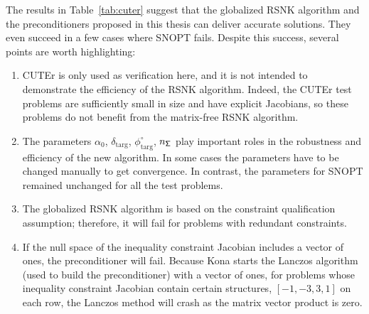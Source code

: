 The results in Table~\ref{tab:cuter} suggest 
that the globalized RSNK algorithm and the preconditioners proposed in this thesis can deliver accurate solutions. They even succeed in a few cases where SNOPT fails. Despite this success, several points are worth highlighting:
\begin{enumerate}\itemsep -2pt
\item CUTEr is only used as verification here, and it is not intended to demonstrate the efficiency of the RSNK algorithm.  Indeed, the CUTEr test problems are sufficiently small in size and have explicit Jacobians, so these problems do not benefit from the matrix-free RSNK algorithm.

\item The parameters \textbf{$\alpha_0$},  $\delta_{\text{targ}}$, $\phi^{\circ}_{\text{targ}}$,  $n_{\mathsf{\Sigma}}$ play important roles in the robustness and efficiency of the new algorithm. In some cases the parameters have to be changed manually to get convergence. In contrast, the parameters for SNOPT remained unchanged for all the test problems. 
\item The globalized RSNK algorithm is based on the constraint qualification assumption; therefore, it will fail for problems with redundant constraints.    
\item If the null space of the inequality constraint Jacobian includes a vector of ones, the preconditioner will fail.  Because Kona starts the Lanczos algorithm (used to build the preconditioner) with a vector of ones, 
for problems whose inequality constraint Jacobian contain certain structures, \eg $[-1, -3, 3, 1]$ on each row, the Lanczos method will crash as the matrix vector product is zero. 
 
\end{enumerate} 


